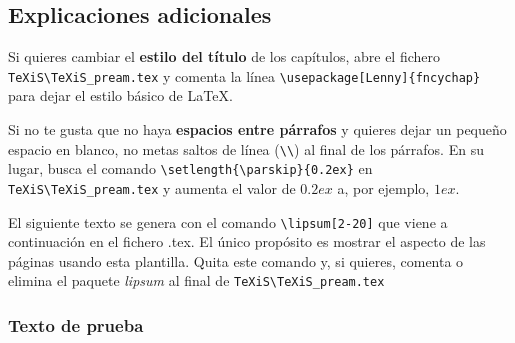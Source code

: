 \subsection{Explicaciones adicionales}
Si quieres cambiar el \textbf{estilo del título} de los capítulos, abre el fichero \verb|TeXiS\TeXiS_pream.tex| y comenta la línea \verb|\usepackage[Lenny]{fncychap}| para dejar el estilo básico de \LaTeX.

Si no te gusta que no haya \textbf{espacios entre párrafos} y quieres dejar un pequeño espacio en blanco, no metas saltos de línea (\verb|\\|) al final de los párrafos. En su lugar, busca el comando  \verb|\setlength{\parskip}{0.2ex}| en \verb|TeXiS\TeXiS_pream.tex| y aumenta el valor de $0.2ex$ a, por ejemplo, $1ex$.

El siguiente texto se genera con el comando \verb|\lipsum[2-20]| que viene a continuación en el fichero .tex. El único propósito es mostrar el aspecto de las páginas usando esta plantilla. Quita este comando y, si quieres, comenta o elimina el paquete \textit{lipsum} al final de \verb|TeXiS\TeXiS_pream.tex|

\subsubsection{Texto de prueba}


\lipsum[2-20]